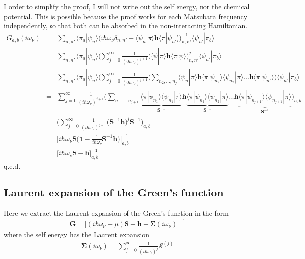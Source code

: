 \documentclass[11pt,a4paper]{report}
\newcommand{\mat}[1]{\bm{#1}}  %
\begin{document}
I order to simplify the proof, I will not write out the self energy,
nor the chemical potential. This is possible because the proof works
for each Matsubara frequency independently, so that both can be
absorbed in the non-interacting Hamiltonian.
\begin{eqnarray}
G_{a,b}(i\omega_\nu)
&=&
\sum_{n,n'}\langle\pi_a|\psi_{n}\rangle
\biggl(i\hbar\omega_\nu\delta_{n,n'}
-
\langle\psi_n|\pi\rangle
\mat{h}
\langle\pi|\psi_{n'}\rangle\biggr)^{-1}_{n,n'}
\langle\psi_{n'}|\pi_b\rangle
\nonumber\\
&=&
\sum_{n,n'}\langle\pi_a|\psi_{n}\rangle
\bigl(
\sum_{j=0}^\infty
\frac{1}{(i\hbar\omega_\nu)^{j+1}}
\biggl(
\langle\psi|\pi\rangle
\mat{h}
\langle\pi|\psi\rangle\biggr)^j_{n,n'}
\langle\psi_{n'}|\pi_b\rangle
\nonumber\\
&=&
\sum_{n,n'}\langle\pi_a|\psi_{n}\rangle
\bigl(
\sum_{j=0}^\infty
\frac{1}{(i\hbar\omega_\nu)^{j+1}}
\biggl(\sum_{n_2,\ldots,n_{j}} 
\langle\psi_{n}|\pi\rangle
\mat{h}
\langle\pi|\psi_{n_2}\rangle\langle\psi_{n_2}|\pi\rangle
\ldots
\mat{h}
\langle\pi|\psi_{n'}\rangle\biggr)
\langle\psi_{n'}|\pi_b\rangle
\nonumber\\
&=&
\sum_{j=0}^\infty\frac{1}{(i\hbar\omega_\nu)^{j+1}}
\biggl(\sum_{n_1,\ldots,n_{j+1}} 
\underbrace{\langle\pi|\psi_{n_1}\rangle
\langle\psi_{n_1}|\pi\rangle}_{\mat{S}^{-1}}
\mat{h}
\underbrace{\langle\pi|\psi_{n_2}\rangle\langle\psi_{n_2}|\pi\rangle}_{\mat{S}^{-1}}
\ldots
\mat{h}
\underbrace{\langle\pi|\psi_{n_{j+1}}\rangle
\langle\psi_{n_{j+1}}|\pi\rangle}_{\mat{S}^{-1}}
\biggr)_{a,b}
\nonumber\\
&=&
\biggl(\sum_{j=0}^\infty\frac{1}{(i\hbar\omega_\nu)^{j+1}}
\biggl(\mat{S}^{-1}\mat{h}\biggr)^{j}\mat{S}^{-1}\biggr)_{a,b}
\nonumber\\
&=&\biggl[i\hbar\omega_\nu\mat{S}\biggl
(\mat{1}-\frac{1}{i\hbar\omega_\nu}\mat{S}^{-1}\mat{h}\Bigr)\biggr]^{-1}_{a,b}
\nonumber\\
&=&\biggl[i\hbar\omega_\nu\mat{S}-\mat{h}\biggr]^{-1}_{a,b}
\end{eqnarray}
q.e.d.

\subsection{Laurent expansion of the Green's function}
Here we extract the Laurent expansion of the Green's function in the form
\begin{eqnarray}
\mat{G}=\biggl[(i\hbar\omega_\nu+\mu)\mat{S}
-\mat{h}-\mat{\Sigma}(i\omega_\nu)\biggr]^{-1}
\end{eqnarray}
where the self energy has the Laurent expansion
\begin{eqnarray}
\mat{\Sigma}(i\omega_\nu)
=\sum_{j=0}^\infty\frac{1}{(i\hbar\omega_\nu)^j}\mathcal{S}^{(j)}
\end{eqnarray}
\end{document}
